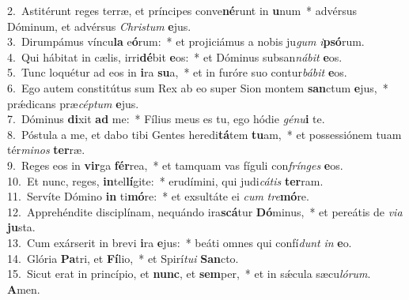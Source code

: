 {2.~}Astitérunt reges terræ, et príncipes conve\textbf{né}runt in \textbf{u}num~* advérsus Dóminum, et advérsus \textit{Chri}\textit{stum} \textbf{e}jus.\\
{3.~}Dirumpámus víncu\textbf{la} e\textbf{ó}rum:~* et projiciámus a nobis ju\textit{gum} \textit{i}\textbf{psó}rum.\\
{4.~}Qui hábitat in cælis, irri\textbf{dé}bit \textbf{e}os:~* et Dóminus subsan\textit{ná}\textit{bit} \textbf{e}os.\\
{5.~}Tunc loquétur ad eos in \textbf{i}ra \textbf{su}a,~* et in furóre suo contur\textit{bá}\textit{bit} \textbf{e}os.\\
{6.~}Ego autem constitútus sum Rex ab eo super Sion montem \textbf{san}ctum \textbf{e}jus,~* prǽdicans præ\textit{cép}\textit{tum} \textbf{e}jus.\\
{7.~}Dóminus \textbf{di}xit \textbf{ad} me:~* Fílius meus es tu, ego hódie \textit{gé}\textit{nu}\textbf{i} te.\\
{8.~}Póstula a me, et dabo tibi Gentes heredi\textbf{tá}tem \textbf{tu}am,~* et possessiónem tuam tér\textit{mi}\textit{nos} \textbf{ter}ræ.\\
{9.~}Reges eos in \textbf{vir}ga \textbf{fér}rea,~* et tamquam vas fíguli con\textit{frín}\textit{ges} \textbf{e}os.\\
{10.~}Et nunc, reges, \textbf{in}tel\textbf{lí}gite:~* erudímini, qui judi\textit{cá}\textit{tis} \textbf{ter}ram.\\
{11.~}Servíte Dómino \textbf{in} ti\textbf{mó}re:~* et exsultáte ei \textit{cum} \textit{tre}\textbf{mó}re.\\
{12.~}Apprehéndite disciplínam, nequándo ira\textbf{scá}tur \textbf{Dó}minus,~* et pereátis de \textit{vi}\textit{a} \textbf{ju}sta.\\
{13.~}Cum exárserit in brevi \textbf{i}ra \textbf{e}jus:~* beáti omnes qui confí\textit{dunt} \textit{in} \textbf{e}o.\\
{14.~}Glória \textbf{Pa}tri, et \textbf{Fí}lio,~* et Spirí\textit{tu}\textit{i} \textbf{San}cto.\\
{15.~}Sicut erat in princípio, et \textbf{nunc}, et \textbf{sem}per,~* et in sǽcula sæcu\textit{ló}\textit{rum}. \textbf{A}men.\\
